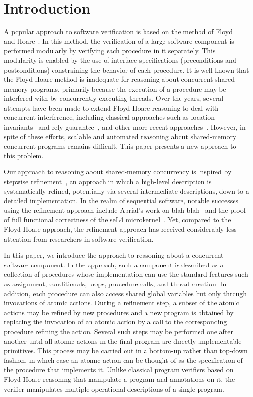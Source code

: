 \section{Introduction}
\label{sec:introduction}

A popular approach to software verification is based on the method of Floyd~\cite{Floyd} and Hoare~\cite{Hoare}.
In this method, the verification of a large software component is performed modularly by verifying each procedure in it separately.
This modularity is enabled by the use of interface specifications (preconditions and postconditions) constraining the behavior of each procedure.
It is well-known that the Floyd-Hoare method is inadequate for reasoning about concurrent shared-memory programs,
primarily because the execution of a procedure may be interfered with by concurrently executing threads.
Over the years, several attempts have been made to extend Floyd-Hoare reasoning to deal with concurrent interference, 
including classical approaches such as location invariants~\cite{Ashcroft,OwickiGries} and rely-guarantee~\cite{Jones},
and other more recent approaches~\cite{concurrent-separation-logic,deny-guarantee,hoare-type-theory}.
However, in spite of these efforts, scalable and automated reasoning about shared-memory concurrent programs remains difficult.
This paper presents a new approach to this problem.

Our approach to reasoning about shared-memory concurrency is inspired by stepwise refinement~\cite{Dijkstra}, 
an approach in which a high-level description is systematically refined, 
potentially via several intermediate descriptions, down to a detailed implementation.
In the realm of sequential software, notable successes using the refinement approach include Abrial's work on blah-blah~\cite{Abrial}
and the proof of full functional correctness of the seL4 microkernel~\cite{seL4}.
Yet, compared to the Floyd-Hoare approach, 
the refinement approach has received considerably less attention from researchers in software verification.

In this paper, we introduce the \civl approach to reasoning about a concurrent software component.
In the \civl approach, such a component is described as a collection of procedures whose implementation 
can use the standard features such as assignment, conditionals, loops, procedure calls, and thread creation. 
In addition, each procedure can also access shared global variables but only through invocations of atomic actions.
During a refinement step, a subset of the atomic actions may be refined by new procedures and a new program is 
obtained by replacing the invocation of an atomic action by a call to the corresponding procedure refining the action.
Several such steps may be performed one after another until all atomic actions in the final program are directly implementable primitives.
This process may be carried out in a bottom-up rather than top-down fashion, in which case an atomic action 
can be thought of as the specification of the procedure that implements it.
Unlike classical program verifiers based on Floyd-Hoare reasoning that manipulate a program and annotations on it, 
the \civl verifier manipulates multiple operational descriptions of a single program. 

